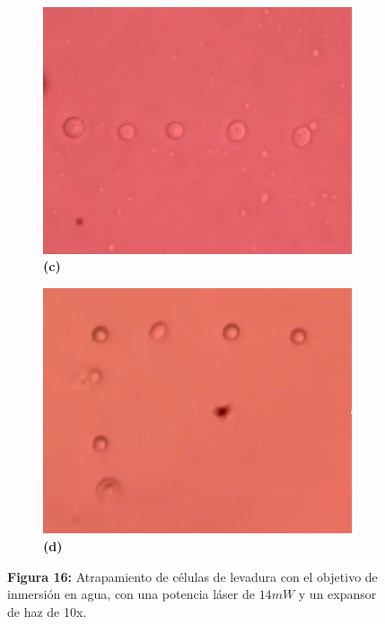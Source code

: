 \documentclass[10pt,aspectratio=1610,compress,dvipsnames]{beamer}
\begin{document}
\begin{frame}
{\begin{figure}
  \begin{subfigure}[b]{0.2\linewidth}
    \includegraphics[width=\linewidth]{particlesnow.png} %
    \caption*{\textbf{(c)}}
    \label{fig7:c}
  \end{subfigure}\hspace{0.5cm} %
  \begin{subfigure}[b]{0.2\linewidth}
    \includegraphics[width=\linewidth]{Particles3.png} %
    \caption*{\textbf{(d)}}
    \label{fig7:d}
  \end{subfigure}
  \captionsetup{labelformat = empty}
  \caption{\textbf{Figura 16: }
Atrapamiento de células de levadura con el objetivo de inmersión en agua, con una potencia láser de $14mW$ y un expansor de haz de 10x. }
  \label{poresfrustrules}
\end{figure}


}
\end{frame}
\end{document}
